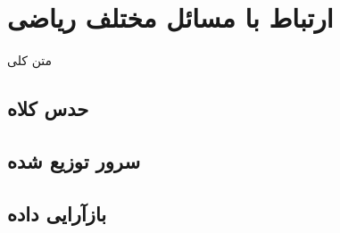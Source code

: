 \chapter{
	ارتباط با مسائل مختلف ریاضی
}
متن کلی

\section{
	حدس کلاه
}

\section{
	سرور توزیع شده
}

\section{
	بازآرایی داده
}
